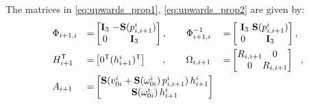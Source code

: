 \begin{algorithm}
%
%
%
%
The matrices in \eqref{eq:upwards_prop1}, \eqref{eq:upwards_prop2} are given by:
%
\begin{alignat*}{3}
&\Phi_{i+1,i} &=& \mat{
\mathbf{I}_{3} \!\!&\!\! -\mathbf{S}(p^{i}_{i,i+1}) \\
0     \!\!&\!\! \mathbf{I}_{3}
}, \quad \quad
%
\Phi^{-1}_{i+1,i} &=& \mat{
\,\, \mathbf{I}_{3} \!\!&\!\! \mathbf{S}(p^{i}_{i,i+1}) \\
0     \!\!&\!\! \mathbf{I}_{3}
}, \\
%
&H^\mathsf{T}_{i+1} &=& \mat{ 
0^\mathsf{T} \!\!\!&\!\!\! ( h^{i}_{i+1} )^\mathsf{T}
} \quad \,\,\,\,, \quad \quad
%
%
\Omega_{i,i+1} &=& \mat{ 
R_{i,i+1} \!\!\!&\!\!\! 0         \\ 
0          \!\!\!&\!\!\! R_{i,i+1} 
}\,\,\,\,,\\
%
&A_{i+1} &=& \mat{
\mathbf{S}(v^{i}_{0i} + \mathbf{S}(\omega^{i}_{0i}) \, p^{i}_{i,i+1}) \, h^{i}_{i+1} \\
\mathbf{S}(\omega^{i}_{0i}) \, h^{i}_{i+1} }
\end{alignat*}
%

\end{algorithm}
